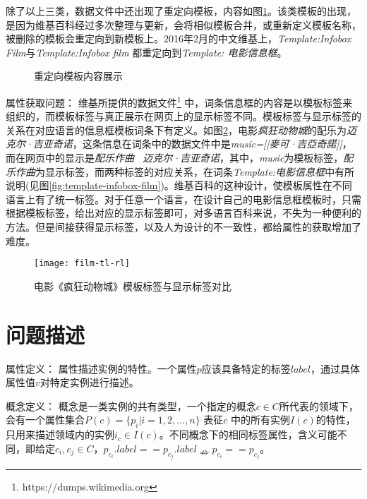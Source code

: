 除了以上三类，数据文件中还出现了{\heiti 重定向模板}，内容如图\ref{fig:template-redirect}。该类模板的出现，是因为维基百科经过多次整理与更新，会将相似模板合并，或重新定义模板名称，被删除的模板会重定向到新模板上。2016年2月的中文维基上，\textit{Template:Infobox Film}与\textit{Template:Infobox film} 都重定向到\textit{Template: 电影信息框}。

\begin{figure}[ht]
  \centering
  \caption{重定向模板内容展示}
  \label{fig:template-redirect}
\end{figure}

{\heiti 属性获取问题：}
维基所提供的数据文件\footnote{https://dumps.wikimedia.org} 中，词条信息框的内容是以{\heiti 模板标签}来组织的，而模板标签与真正展示在网页上的{\heiti 显示标签}不同。模板标签与显示标签的关系在对应语言的信息框模板词条下有定义。如图\ref{fig:film-tl-rl}，电影\textit{疯狂动物城}的配乐为\textit{迈克尔·吉亚奇诺}，这条信息在词条中的数据文件中是\textit{music=[[麥可·吉亞奇諾]]}，而在网页中的显示是\textit{配乐作曲 \ 迈克尔·吉亚奇诺}，其中，\textit{music}为模板标签，\textit{配乐作曲}为显示标签，而两种标签的对应关系，在词条\textit{Template:电影信息框}中有所说明(见图\ref{fig:template-infobox-film})。维基百科的这种设计，使模板属性在不同语言上有了统一标签。对于任意一个语言，在设计自己的电影信息框模板时，只需根据模板标签，给出对应的显示标签即可，对多语言百科来说，不失为一种便利的方法。但是间接获得显示标签，以及人为设计的不一致性，都给属性的获取增加了难度。

\begin{figure}[ht]
  \centering
  \texttt{[image: film-tl-rl]}
  \caption{电影《疯狂动物城》模板标签与显示标签对比}
  \label{fig:film-tl-rl}
\end{figure}

\section{问题描述}

{\heiti 属性定义：} 属性描述实例的特性。一个属性$p$应该具备特定的标签$label$，通过具体属性值$v$对特定实例进行描述。

{\heiti 概念定义：}
概念是一类实例的共有类型，一个指定的概念$c \in C$所代表的领域下，会有一个属性集合$P(c)=\{p_{i}|i=1,2,...,n\}$ 表征$c$ 中的所有实例$I(c)$的特性，只用来描述领域内的实例$i_{c} \in I(c)$。不同概念下的相同标签属性，含义可能不同，即给定$c_i,c_j \in C$，$p_{c_i}.label == p_{c_j}.label\nRightarrow p_{c_i} == p_{c_j}$。

